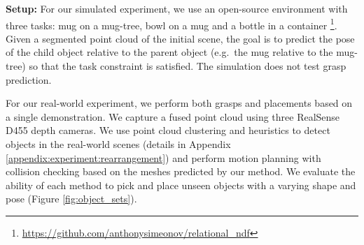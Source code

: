 \documentclass{article}
\begin{document}
\begin{table}[t!]
    \centering
    \caption{Success rates of \hl{real-world robot} pick-and-place experiments with a single demonstration. The manipulated object (e.g. a mug) starts in an arbitrary pose (we use a stand to get a range of poses) and the target object (e.g. a mug-tree) starts in an arbitrary upright pose. $^1$The target object (e.g. the mug tree) is in a fixed pose for this experiment, as NDF does not handle target object variation. Each entry is measured over 25 - 30 trials with unseen object pairs.}
    \label{tab:real_world}
\end{table}

\textbf{Setup:} For our simulated experiment, we use an open-source environment with three tasks: mug on a mug-tree, bowl on a mug and a bottle in a  container \cite{simeonov22se}\footnote{\url{https://github.com/anthonysimeonov/relational_ndf}}. Given a segmented point cloud of the initial scene, the goal is to predict the pose of the child object relative to the parent object (e.g.~the mug relative to the mug-tree) so that the task constraint is satisfied. The simulation does not test grasp prediction.

For our real-world experiment, we perform both grasps and placements based on a single demonstration. We capture a fused point cloud using three RealSense D455 depth cameras. We use point cloud clustering and heuristics to detect objects in the real-world scenes (details in Appendix \ref{appendix:experiment:rearrangement}) and perform motion planning with collision checking based on the meshes predicted by our method. We evaluate the ability of each method to pick and place unseen objects with a varying shape and pose (Figure \ref{fig:object_sets}).
\end{document}
